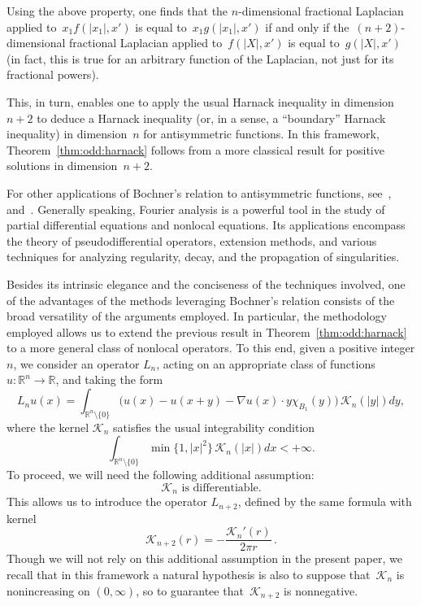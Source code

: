 \documentclass[a4paper,12pt,reqno]{amsart}
\numberwithin{equation}{section}
\theoremstyle{definition}
\theoremstyle{notation}
\newcommand{\R}{\mathds{R}}
\newcommand{\jj}{{\mathcal{K}}}
\begin{document}
Using the above property, one finds that the $n$-dimensional fractional Laplacian applied to~$x_1 f(|x_1|, x')$ is equal to~$x_1 g(|x_1|, x')$ if and only if the~$(n + 2)$-dimensional fractional Laplacian applied to~$f(|X|, x')$ is equal to~$ g(|X|, x')$ (in fact, this is true for an arbitrary function of the Laplacian, not just for its fractional powers).


This, in turn, enables one to apply the usual Harnack inequality in dimension~$n + 2$ to deduce a Harnack inequality (or, in a sense, a ``boundary'' Harnack inequality)
in dimension~$ n$ for antisymmetric functions. In this framework,
Theorem~\ref{thm:odd:harnack} follows from a more classical result for positive solutions in dimension~$n + 2$.\medskip


For other applications of
Bochner's relation to antisymmetric functions, see~\cite[Theorem~1]{DYDA},
\cite[Theorem~1.5 and Proposition~3.1]{KR16} and~\cite{F-F}.
Generally speaking, Fourier analysis is a powerful tool in the study of partial differential equations and nonlocal equations. Its applications encompass the theory of pseudodifferential operators, extension methods, and various techniques for analyzing regularity, decay, and the propagation of singularities.\medskip


Besides its intrinsic elegance and the conciseness of the techniques involved, one of the advantages of the methods leveraging Bochner's relation consists of the broad versatility
of the arguments employed. In particular, the methodology employed allows us to
extend the previous result in Theorem~\ref{thm:odd:harnack} to a more general class of nonlocal operators. To this end, 
given a positive integer $n$, we consider an operator $L_n$, acting on an appropriate class of functions $u:\R^n\to \R$, and taking the form
\begin{equation}
 L_n u(x) = \int_{\R^n \setminus \{0\}} \bigl(u(x) - u(x + y) - \nabla u(x) \cdot y \chi_{B_1}(y)\bigr)\, \jj_n(|y|) dy ,
\label{5XOlUbY7}
\end{equation}%
where the kernel $\jj_n$ satisfies the usual integrability condition
\[
 \int_{\R^n \setminus \{0\}} \min\{1, |x|^2\} \, \jj_n(|x|) dx < +\infty .
\]
To proceed, we will need the following additional assumption:
\begin{equation}
\label{radialassumption}
 \text{$\jj_n$ is differentiable.}
\end{equation}
This allows us to introduce the operator $L_{n + 2}$, defined by the same formula with kernel
\begin{equation}
\label{nplus2}
 \jj_{n + 2}(r) = -\frac{\jj_n'(r)}{2 \pi r} \, .
\end{equation}
Though we will not rely on this additional assumption in the present paper, we recall that
in this framework a natural hypothesis is also to suppose that~$\jj_n$ is nonincreasing on $(0, \infty)$, so to guarantee that~$\jj_{n + 2}$ is nonnegative.
\end{document}
